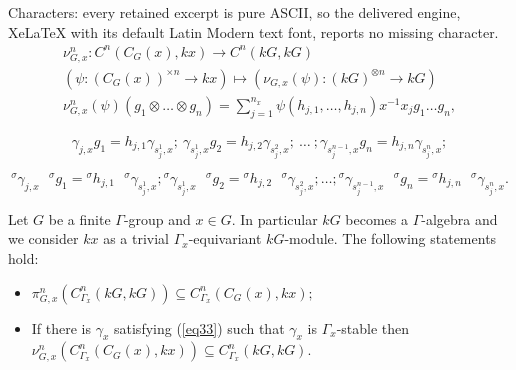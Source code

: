 \documentclass[10pt,a4paper]{amsart}
\begin{document}
Characters: every retained excerpt is pure ASCII, so the delivered engine, XeLaTeX with its default Latin Modern text font, reports no missing character.
  \begin{align}\label{eq32}\nu_{G,x}^n:C^n(C_G(x),kx)\rightarrow C^n(kG,kG) \nonumber \\
  (\psi:(C_G(x))^{\times n}\rightarrow kx)\mapsto (\nu_{G,x}(\psi):(kG)^{\otimes n}\rightarrow kG) \nonumber \\
   \nu_{G,x}^n(\psi)(g_1\otimes \dots \otimes g_n)=\sum_{j=1}^{n_x}\psi(h_{j,1},\dots,h_{j,n})x^{-1}x_j g_1 \dots g_n,
   \end{align}

  \begin{equation}\label{eq33}
  \gamma_{j,x}g_1=h_{j,1}\gamma_{s_j^1,x};\  \gamma_{s_j^1,x}g_2=h_{j,2}\gamma_{s_j^2,x};\ \dots\ ;\gamma_{s_j^{n-1},x}g_n=h_{j,n}\gamma_{s_j^n,x};
  \end{equation}

  \begin{equation}\label{eq33'} {}^{\sigma}\gamma_{j,x}\mbox{ }^{\sigma}g_1={}^{\sigma}h_{j,1}\mbox{ }^{\sigma}\gamma_{s_j^1,x}; {}^{\sigma}\gamma_{s_j^1,x}\mbox{ }^{\sigma}g_2=
    {}^{\sigma}h_{j,2}\mbox{ }^{\sigma}\gamma_{s_j^2,x};
    \dots;{}^{\sigma}\gamma_{s_j^{n-1},x}\mbox{ }^{\sigma}g_n={}^{\sigma}h_{j,n}\mbox{ }^{\sigma}\gamma_{s_j^n,x}.
   \end{equation}

\begin{proposition}\label{prop32} Let $G$ be a finite $\Gamma$-group and $x\in G$. In particular $kG$ becomes a $\Gamma$-algebra and we consider $kx$ as a trivial  $\Gamma_x$-equivariant $kG$-module.  The following statements hold:
\begin{itemize}
\item[i).] $\pi_{G,x}^n(C_{\Gamma_x}^n(kG,kG))\subseteq C_{\Gamma_x}^n(C_G(x),kx);$
\item[ii).]  If there is $\gamma_x$ satisfying (\ref{eq33}) such that $\gamma_x$ is $\Gamma_x$-stable then $\nu_{G,x}^n(C_{\Gamma_x}^n(C_G(x),kx))\subseteq C_{\Gamma_x}^n(kG,kG).$
\end{itemize}
\end{proposition}
\end{document}
